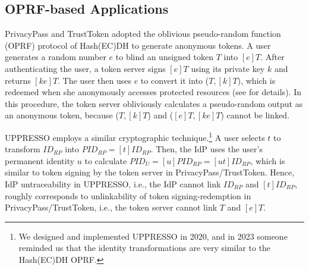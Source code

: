 \subsection{OPRF-based Applications}
PrivacyPass and TrustToken \cite{privacypass,trusttoken} adopted the oblivious pseudo-random function (OPRF) protocol of Hash(EC)DH \cite{oprf-proved,voprf-proved} to generate anonymous tokens. %
A user generates a random number $e$ to blind an unsigned token $T$ into $[e]T$. After authenticating the user, a token server signs $[e]T$ using its private key $k$ and returns $[k e]T$. The user then uses $e$ to convert it into ($T, [k]T$),
        which is redeemed when she anonymously accesses protected resources
 (see \cite{privacypass,trusttoken} for details).
In this procedure, the token server obliviously calculates a pseudo-random output as an anonymous token,
    because ($T, [k]T$) and ($[e]T, [ke]T$) cannot be linked.


UPPRESSO employs a similar cryptographic technique.\footnote{We designed and implemented UPPRESSO in 2020, and in 2023 someone reminded us that the identity transformations are very similar to the Hash(EC)DH OPRF.} 
 A user selects $t$ to transform $ID_{RP}$ into $PID_{RP} = [t]ID_{RP}$.
Then, the IdP uses the user's permanent identity $u$ to calculate $PID_U = [u]PID_{RP} = [ut]ID_{RP}$,
which is similar to token signing by the token server in PrivacyPass/TrustToken.
Hence, IdP untraceability in UPPRESSO, i.e., the IdP cannot link $ID_{RP}$ and $[t]ID_{RP}$,
 roughly corresponds to unlinkability of token signing-redemption in PrivacyPass/TrustToken, i.e., the token server cannot link $T$ and $[e]T$.

